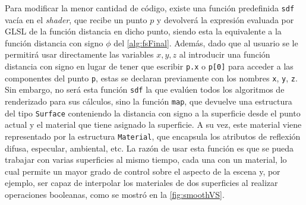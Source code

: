 Para modificar la menor cantidad de código, existe una función predefinida \texttt{sdf} vacía en el \textit{shader}, que recibe un punto $p$ y devolverá la expresión evaluada por GLSL de la función distancia en dicho punto, siendo esta la equivalente a la función distancia con signo $\phi$ del \autoref{alg:fsFinal}. Además, dado que al usuario se le permitirá usar directamente las variables $x,y,z$ al introducir una función distancia con signo en lugar de tener que escribir \texttt{p.x} o \texttt{p[0]} para acceder a las componentes del punto \texttt{p}, estas se declaran previamente con los nombres \texttt{x}, \texttt{y}, \texttt{z}. Sin embargo, no será esta función \texttt{sdf} la que evalúen todos los algoritmos de renderizado para sus cálculos, sino la función \texttt{map}, que devuelve una estructura del tipo \texttt{Surface} conteniendo la distancia con signo a la superficie desde el punto actual y el material que tiene asignado la superficie. A su vez, este material viene representado por la estructura \texttt{Material}, que encapsula los atributos de reflexión difusa, especular, ambiental, etc. La razón de usar esta función es que se pueda trabajar con varias superficies al mismo tiempo, cada una con un material, lo cual permite un mayor grado de control sobre el aspecto de la escena y, por ejemplo, ser capaz de interpolar los materiales de dos superficies al realizar operaciones booleanas, como se mostró en la \autoref{fig:smoothVS}.\newline

